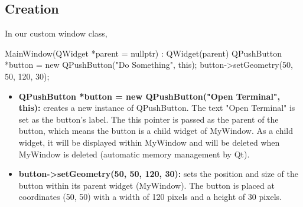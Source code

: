 \documentclass{report}
\begin{document}
    \subsection{Creation}
    \bigbreak \noindent 
    In our custom window class, 
    \bigbreak \noindent 
    \begin{cppcode}
    MainWindow(QWidget *parent = nullptr) : QWidget(parent) {
        QPushButton *button = new QPushButton("Do Something", this);
        button->setGeometry(50, 50, 120, 30);
    }
    \end{cppcode}
    \begin{itemize}
        \item \textbf{QPushButton *button = new QPushButton("Open Terminal", this):} creates a new instance of QPushButton. The text "Open Terminal" is set as the button's label. The this pointer is passed as the parent of the button, which means the button is a child widget of MyWindow. As a child widget, it will be displayed within MyWindow and will be deleted when MyWindow is deleted (automatic memory management by Qt).
        \item \textbf{button->setGeometry(50, 50, 120, 30):} sets the position and size of the button within its parent widget (MyWindow). The button is placed at coordinates (50, 50) with a width of 120 pixels and a height of 30 pixels.
    \end{itemize}
    
    \bigbreak \noindent 
\end{document}

